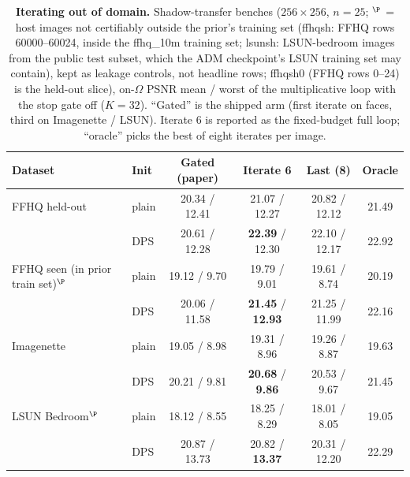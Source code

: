 \begin{table}[t]
    \centering
    \caption{
    \textbf{Iterating out of domain.} Shadow-transfer benches ($256\times256$, $n{=}25$; $^\P$ = host images not certifiably outside the prior's training set (ffhqsh: FFHQ rows 60000--60024, inside the ffhq\_10m training set; lsunsh: LSUN-bedroom images from the public test subset, which the ADM checkpoint's LSUN training set may contain), kept as leakage controls, not headline rows; ffhqsh0 (FFHQ rows 0--24) is the held-out slice), on-$\Omega$ PSNR mean / worst of the multiplicative \method{} loop with the stop gate off ($K{=}32$). ``Gated'' is the shipped arm (first iterate on faces, third on Imagenette / LSUN). Iterate 6 is reported as the fixed-budget full loop; ``oracle'' picks the best of eight iterates per image.
    }
    \label{tab:shadow_transfer_fullloop}
    \small
    \setlength{\tabcolsep}{3.0pt}
    \renewcommand{\arraystretch}{1.08}
    \begin{tabular}{@{}llcccc@{}}
        \toprule
        \textbf{Dataset} & \textbf{Init} & \textbf{Gated (paper)} & \textbf{Iterate 6} & \textbf{Last (8)} & \textbf{Oracle} \\
        \midrule
        FFHQ held-out & plain & 20.34 / 12.41 & 21.07 / 12.27 & 20.82 / 12.12 & 21.49 \\
                      & DPS   & 20.61 / 12.28 & \textbf{22.39} / 12.30 & 22.10 / 12.17 & 22.92 \\
        FFHQ seen (in prior train set)$^\P$ & plain & 19.12 / 9.70  & 19.79 / 9.01  & 19.61 / 8.74  & 20.19 \\
                      & DPS   & 20.06 / 11.58 & \textbf{21.45} / \textbf{12.93} & 21.25 / 11.99 & 22.16 \\
        Imagenette    & plain & 19.05 / 8.98  & 19.31 / 8.96  & 19.26 / 8.87  & 19.63 \\
                      & DPS   & 20.21 / 9.81  & \textbf{20.68} / \textbf{9.86} & 20.53 / 9.67 & 21.45 \\
        LSUN Bedroom$^\P$ & plain & 18.12 / 8.55  & 18.25 / 8.29 & 18.01 / 8.05 & 19.05 \\
                      & DPS   & 20.87 / 13.73 & 20.82 / \textbf{13.37} & 20.31 / 12.20 & 22.29 \\
        \bottomrule
    \end{tabular}
\end{table}

